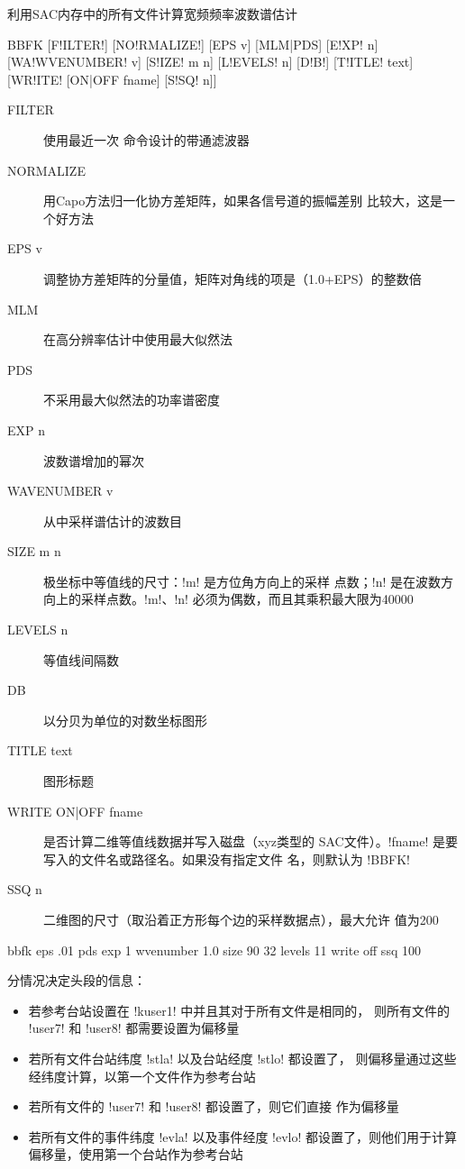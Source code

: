 \label{cmd:bbfk}

利用SAC内存中的所有文件计算宽频频率波数谱估计

\begin{SACSTX}
BBFK [F!ILTER!] [NO!RMALIZE!] [EPS v] [MLM|PDS] [E!XP! n] [WA!WVENUMBER! v]
    [S!IZE! m n] [L!EVELS! n] [D!B!] [T!ITLE! text] [WR!ITE! [ON|OFF fname] [S!SQ! n]]
\end{SACSTX}

\begin{description}
\item [FILTER] 使用最近一次 命令设计的带通滤波器
\item [NORMALIZE] 用Capo方法归一化协方差矩阵，如果各信号道的振幅差别
    比较大，这是一个好方法
\item [EPS v] 调整协方差矩阵的分量值，矩阵对角线的项是（1.0+EPS）的整数倍
\item [MLM] 在高分辨率估计中使用最大似然法
\item [PDS] 不采用最大似然法的功率谱密度
\item [EXP n] 波数谱增加的幂次
\item [WAVENUMBER v] 从中采样谱估计的波数目
\item [SIZE m n] 极坐标中等值线的尺寸：!m! 是方位角方向上的采样
    点数；!n! 是在波数方向上的采样点数。!m!、!n!
    必须为偶数，而且其乘积最大限为40000
\item [LEVELS n] 等值线间隔数
\item [DB] 以分贝为单位的对数坐标图形
\item [TITLE text] 图形标题
\item [WRITE ON|OFF fname] 是否计算二维等值线数据并写入磁盘（xyz类型的
    SAC文件）。!fname! 是要写入的文件名或路径名。如果没有指定文件
    名，则默认为 !BBFK!
\item [SSQ n] 二维图的尺寸（取沿着正方形每个边的采样数据点），最大允许
    值为200
\end{description}

\begin{SACDFT}
bbfk eps .01 pds exp 1 wvenumber 1.0 size 90 32 levels 11
    write off ssq 100
\end{SACDFT}

分情况决定头段的信息：
\begin{itemize}
\item 若参考台站设置在 !kuser1! 中并且其对于所有文件是相同的，
    则所有文件的 !user7! 和 !user8! 都需要设置为偏移量
\item 若所有文件台站纬度 !stla! 以及台站经度 !stlo! 都设置了，
    则偏移量通过这些经纬度计算，以第一个文件作为参考台站
\item 若所有文件的 !user7! 和 !user8! 都设置了，则它们直接
    作为偏移量
\item 若所有文件的事件纬度 !evla! 以及事件经度 !evlo!
    都设置了，则他们用于计算偏移量，使用第一个台站作为参考台站
\end{itemize}

